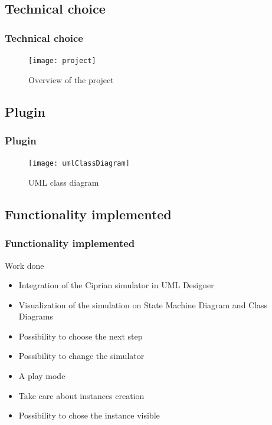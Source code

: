 \documentclass[10pt, svgnames, compress, red]{beamer}
\begin{document}
\subsection{Technical choice}
\begin{frame}
  \frametitle{Technical choice}
  \begin{figure}[h]
    \centering
    \texttt{[image: project]}
    \caption{Overview of the project}
  \end{figure}

  \transdissolve[duration=0.1]
\end{frame}

\subsection{Plugin}
\begin{frame}
  \frametitle{Plugin}
  \begin{figure}[h]
    \centering
    \texttt{[image: umlClassDiagram]}
    \caption{UML class diagram}
  \end{figure}

  \transdissolve[duration=0.1]
\end{frame}

\subsection{Functionality implemented}
\begin{frame}[label=done]
  \frametitle{Functionality implemented}
  \begin{alertblock}{Work done}
    \begin{itemize}
    \item Integration of the Ciprian simulator in UML Designer
    \item Visualization of the simulation on State Machine Diagram and Class Diagrams
    \item Possibility to choose the next step
    \item Possibility to change the simulator
    \item A play mode
    \item Take care about instances creation
    \item Possibility to chose the instance visible
    \end{itemize}
  \end{alertblock}
  \hyperlink{todo}{}
  \transdissolve[duration=0.1]
\end{frame}
\end{document}
